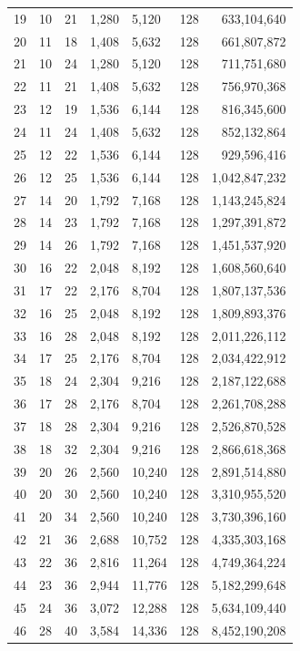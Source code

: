 \begin{table}
\begin{tabular}{l|lllll|r}
19 & 10 & 21 & 1,280 & 5,120 & 128 & 633,104,640 \\
20 & 11 & 18 & 1,408 & 5,632 & 128 & 661,807,872 \\
21 & 10 & 24 & 1,280 & 5,120 & 128 & 711,751,680 \\
22 & 11 & 21 & 1,408 & 5,632 & 128 & 756,970,368 \\
23 & 12 & 19 & 1,536 & 6,144 & 128 & 816,345,600 \\
24 & 11 & 24 & 1,408 & 5,632 & 128 & 852,132,864 \\
25 & 12 & 22 & 1,536 & 6,144 & 128 & 929,596,416 \\
26 & 12 & 25 & 1,536 & 6,144 & 128 & 1,042,847,232 \\
27 & 14 & 20 & 1,792 & 7,168 & 128 & 1,143,245,824 \\
28 & 14 & 23 & 1,792 & 7,168 & 128 & 1,297,391,872 \\
29 & 14 & 26 & 1,792 & 7,168 & 128 & 1,451,537,920 \\
30 & 16 & 22 & 2,048 & 8,192 & 128 & 1,608,560,640 \\
31 & 17 & 22 & 2,176 & 8,704 & 128 & 1,807,137,536 \\
32 & 16 & 25 & 2,048 & 8,192 & 128 & 1,809,893,376 \\
33 & 16 & 28 & 2,048 & 8,192 & 128 & 2,011,226,112 \\
34 & 17 & 25 & 2,176 & 8,704 & 128 & 2,034,422,912 \\
35 & 18 & 24 & 2,304 & 9,216 & 128 & 2,187,122,688 \\
36 & 17 & 28 & 2,176 & 8,704 & 128 & 2,261,708,288 \\
37 & 18 & 28 & 2,304 & 9,216 & 128 & 2,526,870,528 \\
38 & 18 & 32 & 2,304 & 9,216 & 128 & 2,866,618,368 \\
39 & 20 & 26 & 2,560 & 10,240 & 128 & 2,891,514,880 \\
40 & 20 & 30 & 2,560 & 10,240 & 128 & 3,310,955,520 \\
41 & 20 & 34 & 2,560 & 10,240 & 128 & 3,730,396,160 \\
42 & 21 & 36 & 2,688 & 10,752 & 128 & 4,335,303,168 \\
43 & 22 & 36 & 2,816 & 11,264 & 128 & 4,749,364,224 \\
44 & 23 & 36 & 2,944 & 11,776 & 128 & 5,182,299,648 \\
45 & 24 & 36 & 3,072 & 12,288 & 128 & 5,634,109,440 \\
46 & 28 & 40 & 3,584 & 14,336 & 128 & 8,452,190,208 \\

\end{tabular}
\end{table}

